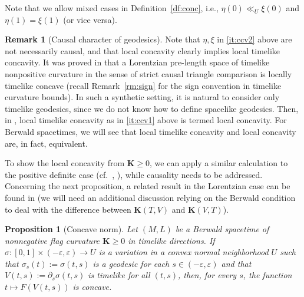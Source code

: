 \documentclass[a4paper,11pt]{article}
\numberwithin{equation}{section}
\theoremstyle{definition}
\newtheorem{remark}[definition]{Remark}
\theoremstyle{plain}
\newtheorem{proposition}[definition]{Proposition}
\newcommand{\lra}{\longrightarrow}
\newcommand{\ve}{\varepsilon}
\newcommand{\bK}{\mathbf{K}}
\newcommand{\bL}{\mathbf{L}}
\begin{document}
Note that we allow mixed cases in Definition~\ref{df:conc}, i.e., $\eta(0) \ll_U \xi(0)$ and $\eta(1)=\xi(1)$ (or vice versa). 

\begin{remark}[Causal character of geodesics]
\label{rm:conc}
Note that $\eta,\xi$ in \eqref{it:ccv2} above are not necessarily causal, and that local concavity clearly implies local timelike concavity.
It was proved in \cite[Proposition~6.1]{BKR} that a Lorentzian pre-length space of timelike nonpositive curvature in the sense of strict causal triangle comparison is locally timelike concave (recall Remark~\ref{rm:sign} for the sign convention in timelike curvature bounds).
In such a synthetic setting, it is natural to consider only timelike geodesics, since we do not know how to define spacelike geodesics.
Then, in \cite[Definition~2.1]{EG}, local timelike concavity as in \eqref{it:ccv1} above is termed local concavity.
For Berwald spacetimes, we will see that local timelike concavity and local concavity are, in fact, equivalent.
\end{remark}

To show the local concavity from $\bK \ge 0$,
we can apply a similar calculation to the positive definite case (cf.\ \cite{KVK}, \cite[Theorem~8.30]{Obook}),
while causality needs to be addressed.
Concerning the next proposition, a related result in the Lorentzian case can be found in \cite[Proposition~11.15(1)]{BEE}
(we will need an additional discussion relying on the Berwald condition to deal with the difference between $\bK(T,V)$ and $\bK(V,T)$).

\begin{proposition}[Concave norm]
\label{prop: concave length}
Let $(M,L)$ be a Berwald spacetime
of nonnegative flag curvature $\bK \ge 0$ in timelike directions. 
If $\sigma \colon [0,1] \times (-\ve,\ve) \lra U$ is a variation in a convex normal neighborhood $U$ such that $\sigma_s(t):=\sigma(t,s)$ is a geodesic for each $s \in (-\ve,\ve)$ and that $V(t,s):=\partial_s\sigma(t,s)$ is timelike for all $(t,s)$, then, for every $s$, the function $t\longmapsto F(V(t,s))$ is concave. 
\end{proposition}
\end{document}
